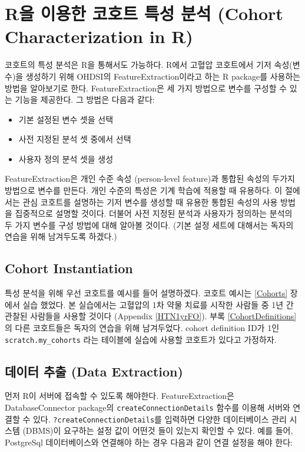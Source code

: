 \documentclass[11pt]{book}
\providecommand{\tightlist}{%
  \setlength{\itemsep}{0pt}\setlength{\parskip}{0pt}}
\theoremstyle{definition}
\theoremstyle{definition}
\theoremstyle{definition}
\theoremstyle{remark}
\begin{document}
\section{R을 이용한 코호트 특성 분석 (Cohort Characterization in
R)}\label{r-----cohort-characterization-in-r}

코호트의 특성 분석은 R을 통해서도 가능하다. R에서 고혈압 코호트에서 기저
속성(변수)을 생성하기 위해 OHDSI의 FeatureExtraction이라고 하는 R
package를 사용하는 방법을 알아보기로 한다. FeatureExtraction은 세 가지
방법으로 변수를 구성할 수 있는 기능을 제공한다. 그 방법은 다음과 같다:

\begin{itemize}
\tightlist
\item
  기본 설정된 변수 셋을 선택
\item
  사전 지정된 분석 셋 중에서 선택
\item
  사용자 정의 분석 셋을 생성
\end{itemize}

FeatureExtraction은 개인 수준 속성 (person-level feature)과 통합된
속성의 두가지 방법으로 변수를 만든다. 개인 수준의 특성은 기계 학습에
적용할 때 유용하다. 이 절에서는 관심 코호트를 설명하는 기저 변수를
생성할 때 유용한 통합된 속성의 사용 방법을 집중적으로 설명할 것이다.
더불어 사전 지정된 분석과 사용자가 정의하는 분석의 두 가지 변수를 구성
방법에 대해 알아볼 것이다. (기본 설정 세트에 대해서는 독자의 연습을 위해
남겨두도록 하겠다.)

\subsection{Cohort Instantiation}\label{cohort-instantiation}

특성 분석을 위해 우선 코호트를 예시를 들어 설명하겠다. 코호트 예시는
\ref{Cohorts} 장에서 실습 했었다. 본 실습에서는 고혈압의 1차 약물 치료를
시작한 사람들 중 1년 간 관찰된 사람들을 사용할 것이다 (Appendix
\ref{HTN1yrFO}). 부록 \ref{CohortDefinitions} 의 다른 코호트들은 독자의
연습을 위해 남겨두었다. cohort definition ID가 1인
\texttt{scratch.my\_cohorts} 라는 테이블에 실습에 사용할 코호트가 있다고
가정하자.

\subsection{데이터 추출 (Data Extraction)}\label{--data-extraction}

먼저 R이 서버에 접속할 수 있도록 해야한다. FeatureExtraction은
DatabaseConnector package의 \texttt{createConnectionDetails} 함수를
이용해 서버와 연결할 수 있다. \texttt{?createConnectionDetails}를
입력하면 다양한 데이터베이스 관리 시스템 (DBMS)이 요구하는 설정 값이
어떤것 들이 있는지 확인할 수 있다. 예를 들어, PostgreSql 데이터베이스와
연결해야 하는 경우 다음과 같이 연결 설정을 해야 한다:
\end{document}
